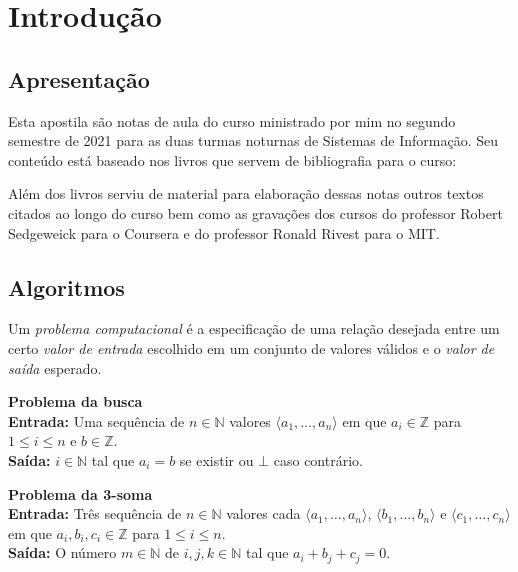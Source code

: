 \chapter{Introdução}

\section{Apresentação}

Esta apostila são notas de aula do curso ministrado por mim no segundo semestre de 2021 para as duas turmas noturnas de Sistemas de Informação.
Seu conteúdo está baseado nos livros que servem de bibliografia para o curso:

\nocite{sedgewick01,sedgewick11,cormen12}


\printbibliography[heading=none,keyword={bibliografia}]


  Além dos livros serviu de material para elaboração dessas notas outros textos citados ao longo do curso bem como as gravações dos cursos do professor Robert Sedgeweick para o Coursera e do professor Ronald Rivest para o MIT.

  

\section{Algoritmos}

Um {\em problema computacional} é a especificação de uma relação desejada entre um certo {\em valor de entrada} escolhido em um conjunto de valores válidos e o {\em valor de saída} esperado.

\begin{example}
  {\bf Problema da busca}\\

  {\bf Entrada:} Uma sequência de $n \in \mathbb{N}$ valores $\langle a_1, \dots, a_n \rangle$ em que $a_i \in \mathbb{Z}$ para $1 \leq i \leq n$ e $b \in \mathbb{Z}$.\\

  {\bf Saída:} $i \in \mathbb{N}$ tal que $a_i = b$ se existir ou $\bot$ caso contrário.
\end{example}

\begin{example}
  {\bf Problema da 3-soma}\\

  {\bf Entrada:} Três sequência de $n \in \mathbb{N}$ valores cada $\langle a_1, \dots, a_n \rangle$,  $\langle b_1, \dots, b_n \rangle$ e $\langle c_1, \dots, c_n \rangle$ em que $a_i, b_i, c_i \in \mathbb{Z}$ para $1 \leq i \leq n$.\\

  {\bf Saída:} O número $m \in \mathbb{N}$ de $i, j, k \in \mathbb{N}$ tal que $a_i + b_j + c_j = 0$.
\end{example}

